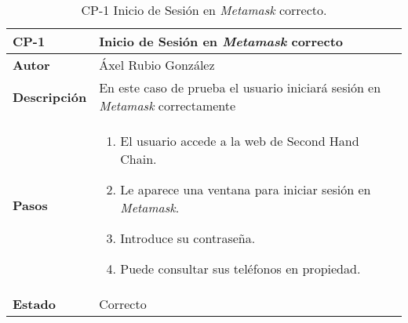 \begin{table}[p]
	\centering
	\begin{tabularx}{\linewidth}{ p{} p{} }
		\toprule
		\textbf{CP-1}    & \textbf{Inicio de Sesión en \textit{Metamask} correcto}\\
		\toprule
		\textbf{Autor}                & Áxel Rubio González \\
		\textbf{Descripción}          & En este caso de prueba el usuario iniciará sesión en  \textit{Metamask} correctamente \\
		\textbf{Pasos}             &
		\begin{enumerate}
			\def\labelenumi{\arabic{enumi}.}
			\tightlist
			\item El usuario accede a la web de Second Hand Chain.
                \item Le aparece una ventana para iniciar sesión en \textit{Metamask}.
                \item Introduce su contraseña.
                \item Puede consultar sus teléfonos en propiedad.
		\end{enumerate}\\
		\textbf{Estado}          & Correcto \\
		\bottomrule
	\end{tabularx}
	\caption{CP-1 Inicio de Sesión en \textit{Metamask} correcto.}
\end{table}


